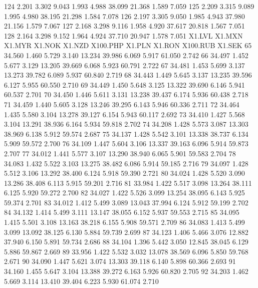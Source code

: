\documentclass[a4paper,11pt]{scrartcl}
\begin{document}
\begin{Schunk}
\begin{Soutput}
124  2.201  3.302    9.043     1.993  4.988   38.099   21.368    1.589  7.059
125  2.209  3.315    9.089     1.995  4.980   38.195   21.298    1.584  7.078
126  2.197  3.305    9.050     1.985  4.943   37.980   21.156    1.579  7.067
127  2.168  3.298    9.116     1.958  4.920   37.617   20.818    1.567  7.051
128  2.164  3.298    9.152     1.964  4.924   37.710   20.947    1.578  7.051
    X1.LVL X1.MXN X1.MYR X1.NOK X1.NZD X100.PHP X1.PLN X1.RON X100.RUB X1.SEK
65  34.560  1.460  5.729  3.140 13.234   39.986  6.069  5.917   61.050  2.742
66  34.497  1.452  5.677  3.129 13.205   39.669  6.068  5.923   60.791  2.722
67  34.481  1.453  5.699  3.137 13.273   39.782  6.089  5.937   60.840  2.719
68  34.443  1.449  5.645  3.137 13.235   39.596  6.127  5.955   60.550  2.710
69  34.449  1.450  5.648  3.125 13.322   39.690  6.146  5.941   60.537  2.701
70  34.450  1.446  5.611  3.131 13.238   39.437  6.174  5.936   60.438  2.718
71  34.459  1.440  5.605  3.128 13.246   39.295  6.143  5.946   60.336  2.711
72  34.464  1.435  5.580  3.104 13.278   39.127  6.154  5.943   60.117  2.692
73  34.410  1.427  5.568  3.104 13.291   38.936  6.164  5.934   59.818  2.702
74  34.208  1.428  5.573  3.087 13.303   38.969  6.138  5.912   59.574  2.687
75  34.137  1.428  5.542  3.101 13.338   38.737  6.134  5.909   59.572  2.700
76  34.109  1.447  5.604  3.106 13.337   39.163  6.096  5.914   59.873  2.707
77  34.012  1.441  5.577  3.107 13.290   38.940  6.065  5.901   59.583  2.704
78  34.083  1.432  5.522  3.103 13.275   38.482  6.086  5.914   59.185  2.716
79  34.097  1.428  5.512  3.106 13.292   38.400  6.124  5.918   59.390  2.721
80  34.024  1.428  5.520  3.090 13.286   38.408  6.113  5.915   59.201  2.716
81  33.984  1.422  5.517  3.098 13.264   38.111  6.125  5.920   59.272  2.700
82  34.027  1.422  5.526  3.099 13.254   38.095  6.143  5.925   59.374  2.701
83  34.012  1.412  5.499  3.089 13.043   37.994  6.124  5.912   59.199  2.702
84  34.132  1.414  5.499  3.111 13.147   38.055  6.152  5.937   59.553  2.715
85  34.095  1.415  5.501  3.108 13.163   38.218  6.155  5.908   59.571  2.709
86  34.083  1.413  5.499  3.099 13.092   38.125  6.130  5.884   59.739  2.699
87  34.123  1.406  5.466  3.076 12.882   37.940  6.150  5.891   59.734  2.686
88  34.104  1.396  5.442  3.050 12.845   38.045  6.129  5.886   59.867  2.669
89  33.956  1.422  5.532  3.032 13.078   38.569  6.096  5.850   59.768  2.671
90  34.090  1.447  5.621  3.074 13.303   39.118  6.140  5.898   60.366  2.693
91  34.160  1.455  5.647  3.104 13.388   39.272  6.163  5.926   60.820  2.705
92  34.203  1.462  5.669  3.114 13.410   39.404  6.223  5.930   61.074  2.710

\end{Soutput}
\end{Schunk}
\end{document}
